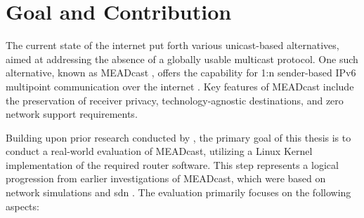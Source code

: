

\section{Goal and Contribution} %
\label{sec:Contribution}



The current state of the internet put forth various unicast-based alternatives,
    aimed at addressing the absence of a globally usable multicast protocol.
One such alternative, known as MEADcast \cite{meadcast1}, offers the capability
    for 1:n sender-based IPv6 multipoint communication over the internet
    \cite{meadcast2}.
Key features of MEADcast include the preservation of receiver privacy,
    technology-agnostic destinations, and zero network support requirements.

Building upon prior research conducted by \citeauthor{meadcast2}
    \cite{meadcast2}, the primary goal of this thesis is to conduct a
    real-world evaluation of MEADcast, utilizing a Linux Kernel implementation
    of the required router software.
This step represents a logical progression from earlier investigations of
    MEADcast, which were based on network simulations \cite{meadcast1} and
    \gls{sdn} \cite{sdn_ba}.
The evaluation primarily focuses on the following aspects:

